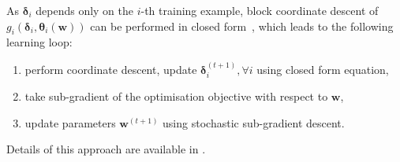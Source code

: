 {As $\bm{\delta}_i$ depends only on the $i$-th training example, block coordinate descent of $g_i(\bm{\delta}_i, \bm{\theta}_i(\mathbf{w}))$ 
can be performed in closed form~\cite{werner2007linear, globerson2008fixing}, 
which leads to the following learning loop:
\begin{enumerate}
\item perform coordinate descent, update $\bm{\delta}_i^{(t+1)}, \forall i$ using closed form equation,
\item take sub-gradient of the optimisation objective with respect to $\mathbf{w}$,
\item update parameters $\mathbf{w}^{(t+1)}$ using stochastic sub-gradient descent.
\end{enumerate}
Details of this approach are available in \cite{meshi2010learning}.
}

